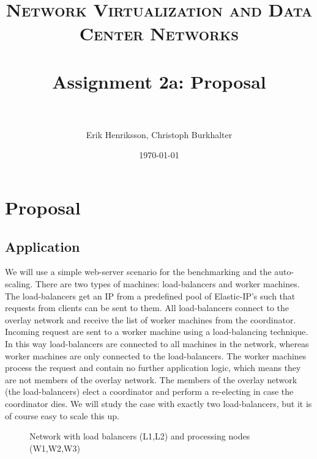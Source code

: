 \documentclass[paper=a4, fontsize=11pt]{scrartcl} %
\title{	
\normalfont \normalsize 
\textsc{Network Virtualization and Data Center Networks} \\ [25pt] %
\horrule{0.5pt} \\[0.4cm] %
\huge Assignment 2a: Proposal\\ %
\horrule{2pt} \\[0.5cm] %
}
\author{Erik Henriksson, Christoph Burkhalter} %
\date{\normalsize\today} %
\numberwithin{equation}{section} %
\numberwithin{figure}{section} %
\numberwithin{table}{section} %
\begin{document}
\maketitle %

\section{Proposal}

\subsection{Application}


We will use a simple web-server scenario for the benchmarking and the auto-scaling. There are two types of machines: load-balancers and worker machines. The load-balancers get an IP from a predefined pool of Elastic-IP's such that requests from clients can be sent to them. All load-balancers connect to the overlay network and receive the list of worker machines from the coordinator. Incoming request are sent to a worker machine using a load-balancing technique. In this way load-balancers are connected to all machines in the network, whereas worker machines are only connected to the load-balancers.
The worker machines process the request and contain no further application logic, which means they are not members of the overlay network.
The members of the overlay network (the load-balancers) elect a coordinator and perform a re-electing in case the coordinator dies. We will study the case with exactly two load-balancers, but it is of course easy to scale this up.


\begin{figure}[h!]
\begin{center}
\end{center}

\caption{Network with load balancers (L1,L2) and processing nodes (W1,W2,W3)}
\end{figure}
\end{document}
